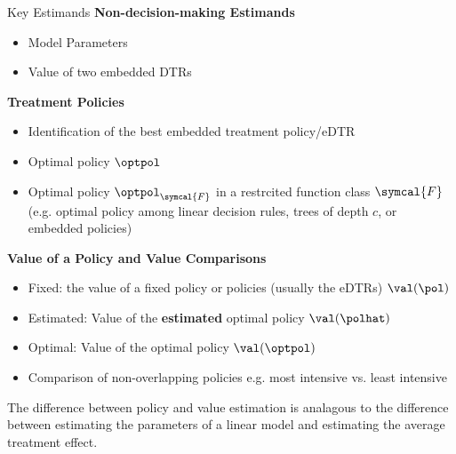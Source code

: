\documentclass[aspectratio=169, professionalfonts]{beamer}
\begin{document}
\begin{frame}{Key Estimands}
	\textbf{Non-decision-making Estimands}
	\begin{itemize}
		\item Model Parameters
	\end{itemize}
	\vfill \pause

	\begin{itemize}
		\item Value of two embedded DTRs
	\end{itemize}

	\textbf{Treatment Policies}
	\begin{itemize}
		\item Identification of the best embedded treatment policy/eDTR
		\item Optimal policy $\optpol$
		\item Optimal policy $\optpol_{\symcal{F}}$ in a restrcited function
		      class $\symcal{F}$ (e.g. optimal policy among linear decision rules, trees of depth
		      $c$, or embedded policies)
	\end{itemize}

	\vfill \pause

	\textbf{Value of a Policy and Value Comparisons}
	\begin{itemize}
		\item Fixed: the value of a fixed policy or policies (usually the eDTRs) $\val(\pol)$
		\item Estimated: Value of the \textbf{estimated} optimal policy $\val(\polhat)$
		\item Optimal: Value of the optimal policy $\val(\optpol)$
		\item Comparison of non-overlapping policies e.g. most intensive vs. least intensive
	\end{itemize}

	\vfill \pause

	\footnotesize The difference between policy and value estimation is analagous to the
	difference between estimating the parameters of a linear model and estimating
	the average treatment effect.
\end{frame}
\end{document}

